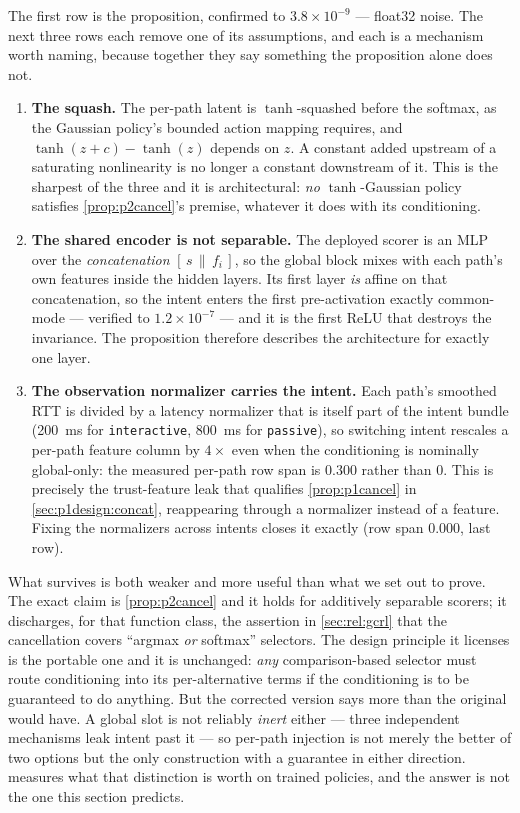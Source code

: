 The first row is the proposition, confirmed to $3.8\times10^{-9}$ --- float32 noise. The next three rows
each remove one of its assumptions, and each is a mechanism worth naming, because together they say
something the proposition alone does not.

\begin{enumerate}
  \item \textbf{The squash.} The per-path latent is $\tanh$-squashed before the softmax, as the Gaussian
  policy's bounded action mapping requires, and $\tanh(z + c) - \tanh(z)$ depends on $z$. A constant
  added upstream of a saturating nonlinearity is no longer a constant downstream of it. This is the
  sharpest of the three and it is architectural: \emph{no} $\tanh$-Gaussian policy satisfies
  \cref{prop:p2cancel}'s premise, whatever it does with its conditioning.
  \item \textbf{The shared encoder is not separable.} The deployed scorer is an MLP over the
  \emph{concatenation} $[\,s \,\|\, f_i\,]$, so the global block mixes with each path's own features
  inside the hidden layers. Its first layer \emph{is} affine on that concatenation, so the intent enters
  the first pre-activation exactly common-mode --- verified to $1.2\times10^{-7}$ --- and it is the first
  ReLU that destroys the invariance. The proposition therefore describes the architecture for exactly
  one layer.
  \item \textbf{The observation normalizer carries the intent.} Each path's smoothed RTT is divided by a
  latency normalizer that is itself part of the intent bundle (\SI{200}{\milli\second} for
  \texttt{interactive}, \SI{800}{\milli\second} for \texttt{passive}), so switching intent rescales a
  per-path feature column by $4\times$ even when the conditioning is nominally global-only: the measured
  per-path row span is 0.300 rather than 0. This is precisely the trust-feature leak that qualifies
  \cref{prop:p1cancel} in \cref{sec:p1design:concat}, reappearing through a normalizer instead of a
  feature. Fixing the normalizers across intents closes it exactly (row span 0.000, last row).
\end{enumerate}

What survives is both weaker and more useful than what we set out to prove. The exact claim is
\cref{prop:p2cancel} and it holds for additively separable scorers; it discharges, for that function
class, the assertion in \cref{sec:rel:gcrl} that the cancellation covers ``argmax \emph{or} softmax''
selectors. The design principle it licenses is the portable one and it is unchanged: \emph{any}
comparison-based selector must route conditioning into its per-alternative terms if the conditioning is
to be guaranteed to do anything. But the corrected version says more than the original would have. A
global slot is not reliably \emph{inert} either --- three independent mechanisms leak intent past it ---
so per-path injection is not merely the better of two options but the only construction with a guarantee
in either direction.  measures what that distinction is worth on trained
policies, and the answer is not the one this section predicts.

